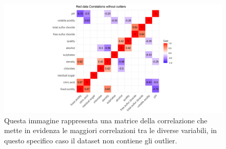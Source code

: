 \begin{figure}[H]
    \centering
    \includegraphics[scale=.5]{images/analisi/correlazione/Correlation_matrix_.pngNoO.png}
    \caption{Questa immagine rappresenta una matrice della correlazione che mette in evidenza le maggiori correlazioni tra le diverse variabili, in questo specifico caso il dataset non contiene gli outlier.}
    \label{fig:correlation_NoO}
\end{figure}
